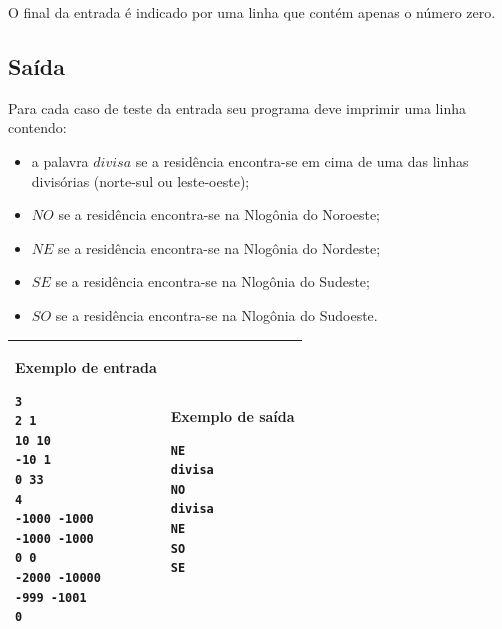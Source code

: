 O final da entrada é indicado por uma linha que contém apenas o número zero.

\subsection*{Saída}


Para cada caso de teste da entrada seu programa deve imprimir uma linha
contendo:
\begin{itemize}
\item a palavra $divisa$ se a residência encontra-se em cima de uma das linhas
divisórias (norte-sul ou leste-oeste);

\item $NO$ se a residência encontra-se na Nlogônia do Noroeste;

\item $NE$ se a residência encontra-se na Nlogônia do Nordeste;

\item $SE$ se a residência encontra-se na Nlogônia do Sudeste;

\item $SO$ se a residência encontra-se na Nlogônia do Sudoeste.

\end{itemize}

\begin{table}[!h]
\centering
\begin{tabular}{|l|l|}
\hline
\begin{minipage}[t]{3in}
\textbf{Exemplo de entrada}
\begin{verbatim}
3
2 1
10 10
-10 1
0 33
4
-1000 -1000
-1000 -1000
0 0
-2000 -10000
-999 -1001
0
\end{verbatim}
\vspace{1mm}
\end{minipage}
&

\begin{minipage}[t]{3in}
\textbf{Exemplo de saída}
\begin{verbatim}
NE
divisa
NO
divisa
NE
SO
SE
\end{verbatim}
\vspace{1mm}
\end{minipage} \\
\hline
\end{tabular}
\end{table}

\newpage
